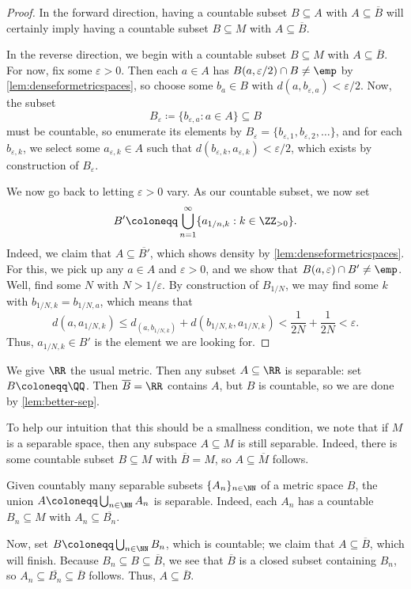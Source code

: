 \documentclass[../notes.tex]{subfiles}
\begin{document}
\begin{proof}
	In the forward direction, having a countable subset $B\subseteq A$ with $A\subseteq\overline B$ will certainly imply having a countable subset $B\subseteq M$ with $A\subseteq\overline B$.

	In the reverse direction, we begin with a countable subset $B\subseteq M$ with $A\subseteq\overline B$. For now, fix some $\varepsilon>0$. Then each $a\in A$ has $B(a,\varepsilon/2)\cap B\ne\emp$ by \autoref{lem:denseformetricspaces}, so choose some $b_a\in B$ with $d(a,b_{\varepsilon,a})<\varepsilon/2$. Now, the subset
	\[B_\varepsilon\coloneqq\{b_{\varepsilon,a}:a\in A\}\subseteq B\]
	must be countable, so enumerate its elements by $B_\varepsilon=\{b_{\varepsilon,1},b_{\varepsilon,2},\ldots\}$, and for each $b_{\varepsilon,k}$, we select some $a_{\varepsilon,k}\in A$ such that $d(b_{\varepsilon,k},a_{\varepsilon,k})<\varepsilon/2$, which exists by construction of $B_\varepsilon$.

	We now go back to letting $\varepsilon>0$ vary. As our countable subset, we now set
	\[B'\coloneqq\bigcup_{n=1}^\infty\{a_{1/n,k}:k\in\ZZ_{>0}\}.\]
	Indeed, we claim that $A\subseteq\overline {B'}$, which shows density by \autoref{lem:denseformetricspaces}. For this, we pick up any $a\in A$ and $\varepsilon>0$, and we show that $B(a,\varepsilon)\cap B'\ne\emp$. Well, find some $N$ with $N>1/\varepsilon$. By construction of $B_{1/N}$, we may find some $k$ with $b_{1/N,k}=b_{1/N,a}$, which means that
	\[d(a,a_{1/N,k})\le d_(a,b_{1/N,k})+d(b_{1/N,k},a_{1/N,k})<\frac1{2N}+\frac1{2N}<\varepsilon.\]
	Thus, $a_{1/N,k}\in B'$ is the element we are looking for.
\end{proof}
\begin{example} \label{ex:all-sep-in-r}
	We give $\RR$ the usual metric. Then any subset $A\subseteq\RR$ is separable: set $B\coloneqq\QQ$. Then $\overline B=\RR$ contains $A$, but $B$ is countable, so we are done by \autoref{lem:better-sep}.
\end{example}
\begin{remark} \label{rem:subspace-of-sep-is-sep}
	To help our intuition that this should be a smallness condition, we note that if $M$ is a separable space, then any subspace $A\subseteq M$ is still separable. Indeed, there is some countable subset $B\subseteq M$ with $\overline B=M$, so $A\subseteq\overline M$ follows.
\end{remark}
\begin{example} \label{ex:union-of-seps-is-sep}
	Given countably many separable subsets $\{A_n\}_{n\in\NN}$ of a metric space $B$, the union $A\coloneqq\bigcup_{n\in\NN}A_n$ is separable. Indeed, each $A_n$ has a countable $B_n\subseteq M$ with $A_n\subseteq\overline{B_n}$.

	Now, set $B\coloneqq\bigcup_{n\in\NN}B_n$, which is countable; we claim that $A\subseteq\overline B$, which will finish. Because $B_n\subseteq B\subseteq\overline B$, we see that $\overline B$ is a closed subset containing $B_n$, so $A_n\subseteq\overline{B_n}\subseteq\overline B$ follows. Thus, $A\subseteq\overline B$.
\end{example}
\end{document}
